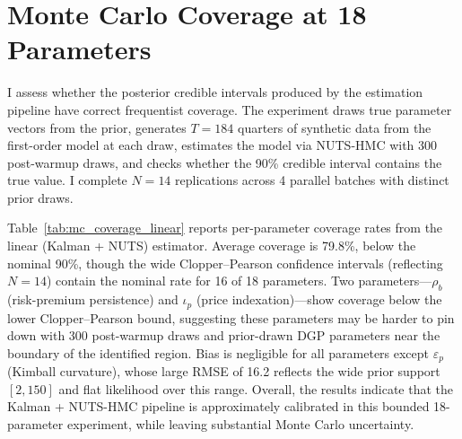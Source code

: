 \documentclass[12pt]{article}
\theoremstyle{plain}
\theoremstyle{definition}
\theoremstyle{remark}
\begin{document}
\section{Monte Carlo Coverage at 18 Parameters}
\label{app:mc_coverage}

I assess whether the posterior credible intervals produced by the estimation pipeline have correct frequentist coverage. The experiment draws true parameter vectors from the prior, generates $T = 184$ quarters of synthetic data from the first-order model at each draw, estimates the model via NUTS-HMC with 300 post-warmup draws, and checks whether the 90\% credible interval contains the true value. I complete $N = 14$ replications across 4 parallel batches with distinct prior draws.

Table~\ref{tab:mc_coverage_linear} reports per-parameter coverage rates from the linear (Kalman + NUTS) estimator. Average coverage is 79.8\%, below the nominal 90\%, though the wide Clopper--Pearson confidence intervals (reflecting $N = 14$) contain the nominal rate for 16 of 18 parameters. Two parameters---$\rho_b$ (risk-premium persistence) and $\iota_p$ (price indexation)---show coverage below the lower Clopper--Pearson bound, suggesting these parameters may be harder to pin down with 300 post-warmup draws and prior-drawn DGP parameters near the boundary of the identified region. Bias is negligible for all parameters except $\varepsilon_p$ (Kimball curvature), whose large RMSE of 16.2 reflects the wide prior support $[2, 150]$ and flat likelihood over this range. Overall, the results indicate that the Kalman + NUTS-HMC pipeline is approximately calibrated in this bounded 18-parameter experiment, while leaving substantial Monte Carlo uncertainty.
\end{document}
